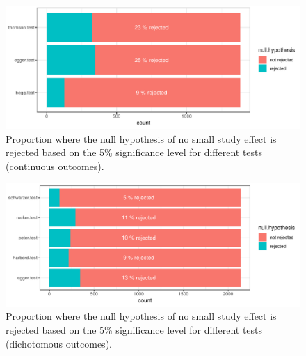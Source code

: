 \documentclass[11pt,a4paper,twoside]{book}\usepackage[]{graphicx}\usepackage[]{color}
\newenvironment{knitrout}{}{} %
\begin{document}
\begin{figure}
\begin{knitrout}
\color{fgcolor}

{\centering \includegraphics[width=\textwidth-3cm]{figure/ch02_figunnamed-chunk-20-1} 

}



\end{knitrout}
\caption{Proportion where the null hypothesis of no small study effect is rejected based on the 5\% significance level for different tests (continuous outcomes).}
\label{bias.results.cont}
\end{figure}

\begin{figure}
\begin{knitrout}
\color{fgcolor}

{\centering \includegraphics[width=\textwidth-3cm]{figure/ch02_figunnamed-chunk-21-1} 

}



\end{knitrout}
\caption{Proportion where the null hypothesis of no small study effect is rejected based on the 5\% significance level for different tests (dichotomous outcomes).}
\label{bias.results.bin}
\end{figure}
\end{document}
